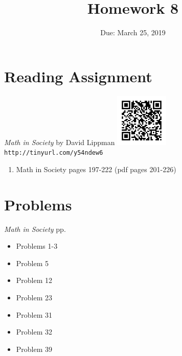 \documentclass{article}
\title{Homework 8}
\date{Due: March 25, 2019}
\begin{document}
\maketitle

\section*{Reading Assignment}
\begin{center}
    {\em Math in Society} by David Lippman\newline
    \includegraphics[width=1in]{readings/society}\newline
    {\tt http://tinyurl.com/y54ndew6}
\end{center}
\begin{enumerate}
\item Math in Society pages 197-222 (pdf pages 201-226)
\end{enumerate}

\section{Problems}
{\em Math in Society} pp.
\begin{itemize}
	\item Problems 1-3
	\item Problem 5
	\item Problem 12
	\item Problem 23
	\item Problem 31
	\item Problem 32
	\item Problem 39
\end{itemize}
\end{document}
